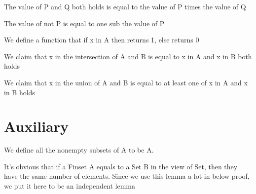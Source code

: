 \begin{lemma}\label{toInt_and}
          The value of P and Q both holds is equal to the value of P times the value of Q
\end{lemma}

\begin{lemma}\label{toInt_not}
          The value of not P is equal to one sub the value of P
\end{lemma}

\begin{definition}\label{char_fun}
  \leanok
          We define a function that if x in A then returns 1, else returns 0
\end{definition}

\begin{lemma}\label{char_fun_inter}
          We claim that x in the intersection of A and B is equal to x in A and x in B both holds
\end{lemma}

\begin{lemma}\label{char_fun_union}
          We claim that x in the union of A and B is equal to at least one of x in A and x in B holds
\end{lemma}
\section{Auxiliary}

\begin{definition}\label{Finset.powerset₀}
  \leanok
          We define all the nonempty subsets of A to be A.
\end{definition}

\begin{lemma}\label{card_eq}
          It's obvious that if a Finset A equals to a Set B in the view of Set, then they have the same number of elements. Since we use this lemma a lot in below proof, we put it here to be an independent lemma
\end{lemma}

\begin{lemma}\label{mul_expand₃}

\end{lemma}

\begin{lemma}\label{mul_expand₂}

\end{lemma}

